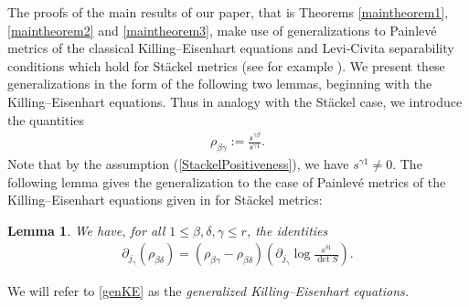 \documentclass[11pt]{article}
\numberwithin{equation}{section}
\newtheorem{Lemma}[Theorem]{Lemma}
\begin{document}
The proofs of the main results of our paper, that is Theorems \ref{maintheorem1}, \ref{maintheorem2} and \ref{maintheorem3}, make use of generalizations to Painlev\'e metrics of the classical Killing--Eisenhart equations and Levi-Civita separability conditions which hold for St\"ackel metrics (see for example \cite{BCR1-2002, BCR2-2002, Eis1934, KaMi1980, KaMi1981, Per1990}). We present these generalizations in the form of the following two lemmas, beginning with the Killing--Eisenhart equations. Thus in analogy with the St\"ackel case, we introduce the quantities
\begin{gather}\label{defrho}
\rho_{\beta \gamma}:=\frac{s^{\gamma \beta}}{s^{\gamma 1}}.
\end{gather}
Note that by the assumption (\ref{StackelPositiveness}), we have $s^{\gamma 1}\neq 0$.
The following lemma gives the generalization to the case of Painlev\'e metrics of the Killing--Eisenhart equations given in \cite{BCR1-2002,BCR2-2002,Eis1934,KaMi1980,KaMi1981} for St\"ackel metrics:
\begin{Lemma} \label{KE}
We have, for all $1\leq \beta, \delta, \gamma \leq r$, the identities
\begin{gather}\label{genKE}
\partial_{j_{\gamma}}(\rho_{ \beta \delta})= (\rho_{\beta \gamma}-\rho_{\beta \delta })\left(\partial_{j_{\gamma}}{\log \frac{s^{\delta 1}}{\det S}}\right).
\end{gather}
\end{Lemma}
We will refer to \eqref{genKE} as the {\emph{generalized Killing--Eisenhart equations.}}
\end{document}
